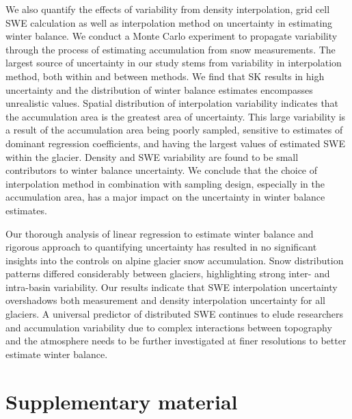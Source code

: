 \documentclass[review,oneside, letterpaper]{igs}
\begin{document}
We also quantify the effects of variability from density interpolation, grid cell SWE calculation as well as interpolation method on uncertainty in estimating winter balance. We conduct a Monte Carlo experiment to propagate variability through the process of estimating accumulation from snow measurements. The largest source of uncertainty in our study stems from variability in interpolation method, both within and between methods. We find that SK results in high uncertainty and the distribution of winter balance estimates encompasses unrealistic values. Spatial distribution of interpolation variability indicates that the accumulation area is the greatest area of uncertainty. This large variability is a result of the accumulation area being poorly sampled, sensitive to estimates of dominant regression coefficients, and having the largest values of estimated SWE within the glacier. Density and SWE variability are found to be small contributors to winter balance uncertainty. We conclude that the choice of interpolation method in combination with sampling design, especially in the accumulation area, has a major impact on the uncertainty in winter balance estimates.

Our thorough analysis of linear regression to estimate winter balance and rigorous approach to quantifying uncertainty has resulted in no significant insights into the controls on alpine glacier snow accumulation. Snow distribution patterns differed considerably between glaciers, highlighting strong inter- and intra-basin variability. Our results indicate that SWE interpolation uncertainty overshadows both measurement and density interpolation uncertainty for all glaciers. A universal predictor of distributed SWE continues to elude researchers and accumulation variability due to complex interactions between topography and the atmosphere needs to be further investigated at finer resolutions to better estimate winter balance. 


%

%


\pagebreak 
\section{Supplementary material}
\end{document}
